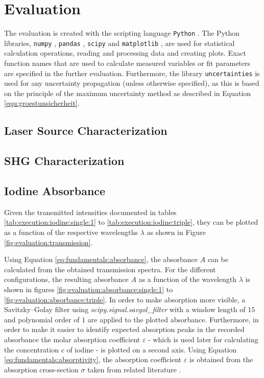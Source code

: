 \section{Evaluation}
\label{sec:evaluation}
The evaluation is created with the scripting language \verb|Python| \cite{PYTHON}.
The Python libraries, \verb|numpy| \cite{harris2020array}, \verb|pandas| \cite{reback2020pandas}, \verb|scipy| \cite{2020SciPy-NMeth} and \verb|matplotlib| \cite{Hunter:2007}, are used for statistical calculation operations, reading and processing data and creating plots.
Exact function names that are used to calculate measured variables or fit parameters are specified in the further evaluation.
Furthermore, the library \verb|uncertainties| \cite{UN} is used for any uncertainty propagation (unless otherwise specified), as this is based on the principle of the maximum uncertainty method as described in Equation \ref{equ:groestunsicherheit}.
\subsection{Laser Source Characterization}


\subsection{SHG Characterization}

\subsection{Iodine Absorbance}
\label{sec:evaluation:iodine-absorbance}

Given the transmitted intensities documented in tables \ref{tab:execution:iodine:single:1} to \ref{tab:execution:iodine:triple}, they can be plotted as a function of the respective wavelengths $\lambda$ as shown in Figure \ref{fig:evaluation:transmission}.

Using Equation \ref{eq:fundamentals:absorbance}, the absorbance $A$ can be calculated from the obtained transmission spectra. For the different configurations, the resulting absorbance $A$ as a function of the wavelength $\lambda$ is shown in figures \ref{fig:evaluation:absorbance:single:1} to \ref{fig:evaluation:absorbance:triple}. In order to make absorption more visible, a Savitzky–Golay filter using \textit{scipy.signal.savgol\_filter} with a window length of $15$ and polynomial order of $1$ are applied to the plotted absorbance. Furthermore, in order to make it easier to identify expected absorption peaks in the recorded absorbance the molar absorption coefficient $\varepsilon$ - which is used later for calculating the concentration $c$ of iodine - is plotted on a second axis. Using Equation \ref{eq:fundamentals:absorptivity}, the absorption coefficient $\varepsilon$ is obtained from the absorption cross-section $\sigma$ taken from related literature \cite{Iodine}.

